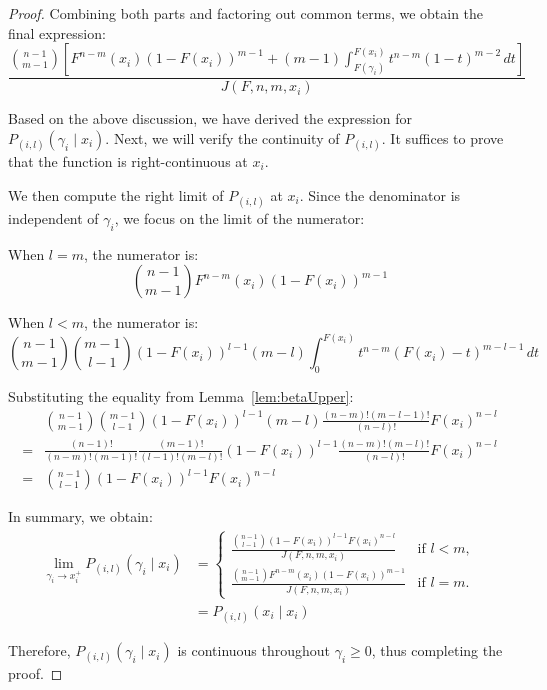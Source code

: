 \begin{proof}
Combining both parts and factoring out common terms, we obtain the final expression:
\[
\frac{\binom{n-1}{m-1} \left [ F^{n-m}(x_i) (1-F(x_i))^{m-1} + (m-1) \int_{F(\gamma_i)}^{F(x_i)} t^{n-m} (1-t)^{m-2} \, dt \right ]}{J(F,n,m,x_i)}
\]

Based on the above discussion, we have derived the expression for \(P_{(i,l)}(\gamma_i \mid x_i)\). Next, we will verify the continuity of \(P_{(i,l)}\). It suffices to prove that the function is right-continuous at \(x_i\).

We then compute the right limit of $P_{(i,l)}$ at \(x_i\). Since the denominator is independent of \(\gamma_i\), we focus on the limit of the numerator:

When \(l = m\), the numerator is:
\[
\binom{n-1}{m-1}F^{n-m}(x_i)(1-F(x_i))^{m-1}
\]

When \(l < m\), the numerator is:
\[
\binom{n-1}{m-1}\binom{m-1}{l-1}(1-F(x_i))^{l-1}(m-l)\int_{0}^{F(x_i)}t^{n-m}(F(x_i)-t)^{m-l-1}\, dt
\]

Substituting the equality from Lemma~\ref{lem:betaUpper}:
\[
\begin{aligned}
    & \binom{n-1}{m-1}\binom{m-1}{l-1}(1-F(x_i))^{l-1}(m-l)\frac{(n-m)!(m-l-1)!}{(n-l)!}F(x_i)^{n-l} \\ 
    = & \frac{(n-1)!}{(n-m)!(m-1)!} \frac{(m-1)!}{(l-1)!(m-l)!}(1-F(x_i))^{l-1}\frac{(n-m)!(m-l)!}{(n-l)!}F(x_i)^{n-l} \\
    = & \binom{n-1}{l-1}(1-F(x_i))^{l-1}F(x_i)^{n-l} 
\end{aligned}
\]

In summary, we obtain:
\[
\begin{aligned}
\lim_{\gamma_i \rightarrow x_i^{+}}P_{(i,l)}(\gamma_i \mid x_i)  & = \begin{cases} 
\frac{\binom{n-1}{l-1}(1-F(x_i))^{l-1}F(x_i)^{n-l} }{J(F,n,m,x_i)} & \text{if } l < m, \\
\frac{\binom{n-1}{m-1}F^{n-m}(x_i)(1-F(x_i))^{m-1}}{J(F,n,m,x_i)} & \text{if } l = m.
\end{cases} \\
& = P_{(i,l)}(x_i \mid x_i) 
\end{aligned}
\]

Therefore, \(P_{(i,l)}(\gamma_i \mid x_i)\) is continuous throughout \(\gamma_i \geq 0\), thus completing the proof.
\end{proof}

